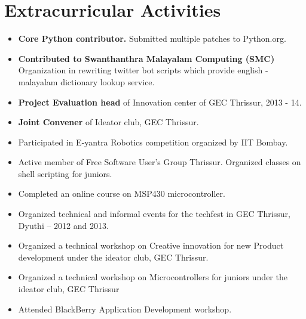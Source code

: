 \documentclass[a4paper,10pt]{article}
\begin{document}
\section{Extracurricular Activities}
\begin{itemize}
\item \textbf{Core Python contributor.} Submitted multiple patches to Python.org.
\item \textbf{Contributed to Swanthanthra Malayalam Computing (SMC)} Organization in rewriting twitter bot scripts which provide english - malayalam dictionary lookup service. 
\item \textbf{Project Evaluation head} of Innovation center of GEC Thrissur, 2013 - 14.
\item \textbf{Joint Convener} of Ideator club, GEC Thrissur.
\item Participated in E-yantra Robotics competition organized by IIT Bombay.
\item Active member of Free Software User’s Group Thrissur. Organized classes on shell scripting for juniors.
\item Completed an online course on MSP430 microcontroller.
\item Organized technical and informal events for the techfest in GEC Thrissur, Dyuthi – 2012 and 2013.
\item Organized a technical workshop on Creative innovation for new Product development under the ideator club, GEC Thrissur.
\item Organized a technical workshop on Microcontrollers for juniors under the ideator club, GEC Thrissur
\item Attended BlackBerry Application Development workshop.
\end{itemize}
\end{document}
